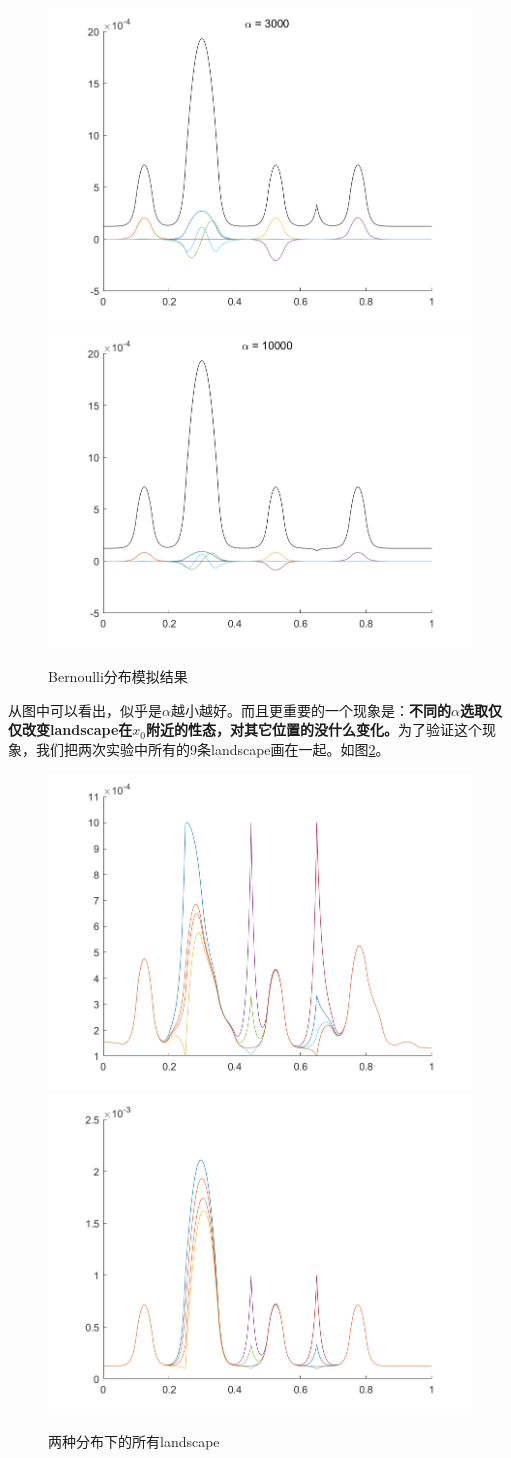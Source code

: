 \documentclass[12pt,a4paper]{article}
\begin{document}
\begin{figure}[htbp]
\includegraphics[width=0.3\linewidth]{parameter/W2X7A3000}
\includegraphics[width=0.3\linewidth]{parameter/W2X7A10000}
\caption{Bernoulli分布模拟结果}
\label{A2}
\end{figure}

从图中可以看出，似乎是$\alpha$越小越好。而且更重要的一个现象是：\textbf{不同的$\alpha$选取仅仅改变landscape在$x_0$附近的性态，对其它位置的没什么变化。}为了验证这个现象，我们把两次实验中所有的9条landscape画在一起。如图\ref{ALLA}。
\begin{figure}[htbp]
\centering
\includegraphics[width=0.3\linewidth]{parameter/ALL1}
\includegraphics[width=0.3\linewidth]{parameter/ALL2}
\caption{两种分布下的所有landscape}
\label{ALLA}
\end{figure}
\end{document}
